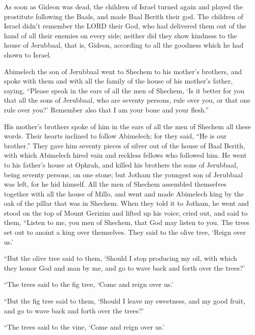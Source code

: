 \myverse{}As soon as Gideon was dead, the children of Israel turned again
and played the prostitute following the Baals, and made Baal Berith their god.
\myverse{}The children of Israel didn’t remember the LORD their God, who had delivered
them out of the hand of all their enemies on every side;
\myverse{}neither did they show kindness to the house of Jerubbaal, that is, Gideon,
according to all the goodness which he had shown to Israel.


\mychapter{} \myverse*{}Abimelech the son of Jerubbaal went to Shechem to his mother’s
brothers, and spoke with them and with all the family of the house of his mother’s father, saying,
\myverse{}“Please speak in the ears of all the men of Shechem, ‘Is it better for you that
all the sons of Jerubbaal, who are seventy persons, rule over you, or that one rule over you?’ Remember
also that I am your bone and your flesh.”

\myverse{}His mother’s brothers spoke of him in the ears of all the men of
Shechem all these words. Their hearts inclined to follow Abimelech; for they said, “He is our brother.”
\myverse{}They gave him seventy pieces of silver out of the house of Baal Berith, with
which Abimelech hired vain and reckless fellows who followed him.
\myverse{}He went to his father’s house at Ophrah, and killed his brothers the sons of
Jerubbaal, being seventy persons, on one stone; but Jotham the youngest son of Jerubbaal was left, for
he hid himself.
\myverse{}All the men of Shechem assembled themselves together with all the house of Millo,
and went and made Abimelech king by the oak of the pillar that was in Shechem.
\myverse{}When they told it to Jotham, he went and stood on the top of Mount Gerizim and
lifted up his voice, cried out, and said to them, “Listen to me, you men of Shechem, that God may listen
to you.
\myverse{}The trees set out to anoint a king over themselves. They said to the olive tree,
‘Reign over us.’

\myverse{}“But the olive tree said to them, ‘Should I stop producing my oil,
with which they honor God and man by me, and go to wave back and forth over the trees?’

\myverse{}“The trees said to the fig tree, ‘Come and reign over us.’

\myverse{}“But the fig tree said to them, ‘Should I leave my sweetness,
and my good fruit, and go to wave back and forth over the trees?’

\myverse{}“The trees said to the vine, ‘Come and reign over us.’


